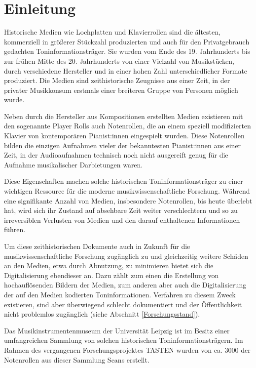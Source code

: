 \section{Einleitung}

Historische Medien wie Lochplatten und Klavierrollen sind die ältesten, kommerziell in größerer Stückzahl produzierten und auch für den Privatgebrauch gedachten Toninformationsträger.
Sie wurden vom Ende des 19. Jahrhunderts bis zur frühen Mitte des 20. Jahrhunderts von einer Vielzahl von Musikstücken, durch verschiedene Hersteller und in einer hohen Zahl unterschiedlicher Formate produziert.
Die Medien sind zeithistorische Zeugnisse aus einer Zeit, in der privater Musikkonsum erstmals einer breiteren Gruppe von Personen möglich wurde.

Neben durch die Hersteller aus Kompositionen erstellten Medien existieren mit den sogenannte Player Rolls auch Notenrollen, die an einem speziell modifizierten Klavier von kontemporären Pianist:innen eingespielt wurden.
Diese Notenrollen bilden die einzigen Aufnahmen vieler der bekanntesten Pianist:innen aus einer Zeit, in der Audioaufnahmen technisch noch nicht ausgereift genug für die Aufnahme musikalischer Darbietungen waren.

Diese Eigenschaften machen solche historischen Toninformationsträger zu einer wichtigen Ressource für die moderne musikwissenschaftliche Forschung.
Während eine signifikante Anzahl von Medien, insbesondere Notenrollen, bis heute überlebt hat, wird sich ihr Zustand auf absehbare Zeit weiter verschlechtern und so zu irreversiblen Verlusten von Medien und den darauf enthaltenen Informationen führen.

Um diese zeithistorischen Dokumente auch in Zukunft für die musikwissenschaftliche Forschung zugänglich zu und gleichzeitig weitere Schäden an den Medien, etwa durch Abnutzung, zu minimieren bietet sich die Digitalisierung ebendieser an.
Dazu zählt zum einen die Erstellung von hochauflösenden Bildern der Medien, zum anderen aber auch die Digitalisierung der auf den Medien kodierten Toninformationen.
Verfahren zu diesem Zweck existieren, sind aber überwiegend schlecht dokumentiert und der Öffentlichkeit nicht problemlos zugänglich (siehe Abschnitt \ref{Forschungsstand}).

Das Musikinstrumentenmuseum der Universität Leipzig ist im Besitz einer umfangreichen Sammlung von solchen historischen Toninformationsträgern.
Im Rahmen des vergangenen Forschungsprojektes TASTEN wurden von ca. 3000 der Notenrollen aus dieser Sammlung Scans erstellt.

